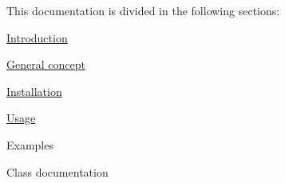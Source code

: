 This documentation is divided in the following sections\+:
\begin{DoxyItemize}
\item \hyperlink{intro}{Introduction}
\item \hyperlink{concept}{General concept}
\item \hyperlink{installation}{Installation}
\item \hyperlink{usage}{Usage}
\item Examples
\item Class documentation 
\end{DoxyItemize}